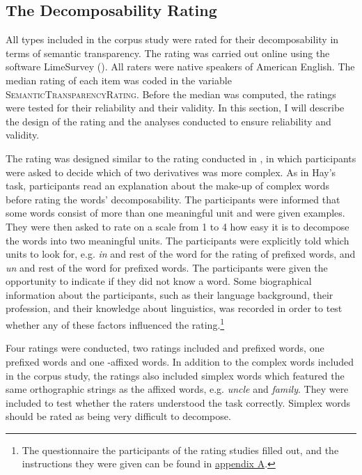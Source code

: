 






\subsection{The Decomposability Rating} \label{decomposability rating corpus}

All types included in the corpus study were rated for their decomposability in terms of semantic transparency. The rating was carried out online using the software LimeSurvey (\citealt{LimeSurveyProjectTeam.2015}). All raters were native speakers of American English. The median rating of each item was coded in the variable  \textsc{SemanticTransparencyRating}. Before the median was computed, the ratings were tested for their reliability and their validity. In this section, I will describe the design of the rating and the analyses conducted to ensure reliability and validity. 

The rating was designed similar to the rating conducted in \cite{Hay.2001}, in which participants were asked to decide which of two derivatives was more complex. As in Hay's task,  participants read an explanation about the make-up of complex words before rating the words' decomposability.  The participants were informed that some words consist of more than one meaningful unit and were given examples. 
They were then asked to rate on a scale from 1 to 4 how easy it is to decompose the words into two meaningful units. The participants were explicitly told which units to look for, e.g.\textit{ in} and rest of the word for the rating of prefixed words, and \textit{un} and rest of the word for prefixed words. The participants were given the opportunity to  indicate if they did not know a word. 
Some biographical information about the participants, such as their language background, their profession, and their knowledge about linguistics, was recorded in order to test whether any of these factors influenced the rating.\footnote{The questionnaire the participants of the rating studies filled out, and the instructions they were given can be found in \hyperref[Appendix A: Decomposability Rating]{appendix A}. } 

Four ratings were conducted, two ratings included  and prefixed words, one  prefixed words and one -affixed words. In addition to the complex words included in the corpus study, the ratings also included simplex words which featured the same orthographic strings as the affixed words, e.g. \textit{{un}cle} and \textit{fami{ly}}. They were included to test whether the raters understood the task correctly. Simplex words should be rated as being very difficult to decompose. 

